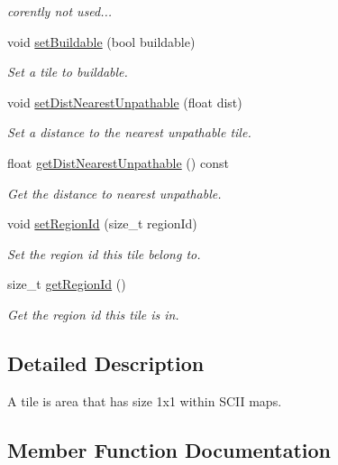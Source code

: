 \begin{DoxyCompactItemize}
\begin{DoxyCompactList}\small\item\em corently not used... \end{DoxyCompactList}\item 
void \hyperlink{classOverseer_1_1Tile_a74ff7d2c91fafc04723059c14d3ec723}{set\+Buildable} (bool buildable)
\begin{DoxyCompactList}\small\item\em Set a tile to buildable. \end{DoxyCompactList}\item 
void \hyperlink{classOverseer_1_1Tile_a5a3b3f84b703b2cd5a9ae56b60e77b4c}{set\+Dist\+Nearest\+Unpathable} (float dist)
\begin{DoxyCompactList}\small\item\em Set a distance to the nearest unpathable tile. \end{DoxyCompactList}\item 
float \hyperlink{classOverseer_1_1Tile_ae2ade272164fce21f27530248add1d18}{get\+Dist\+Nearest\+Unpathable} () const 
\begin{DoxyCompactList}\small\item\em Get the distance to nearest unpathable. \end{DoxyCompactList}\item 
void \hyperlink{classOverseer_1_1Tile_a8f0f9bc7bd55533a4df7cf2cafc08eaa}{set\+Region\+Id} (size\+\_\+t region\+Id)
\begin{DoxyCompactList}\small\item\em Set the region id this tile belong to. \end{DoxyCompactList}\item 
size\+\_\+t \hyperlink{classOverseer_1_1Tile_aa1fa9037029a36f50b3c13130813e825}{get\+Region\+Id} ()
\begin{DoxyCompactList}\small\item\em Get the region id this tile is in. \end{DoxyCompactList}\end{DoxyCompactItemize}


\subsection{Detailed Description}
A tile is area that has size 1x1 within S\+C\+II maps. 

\subsection{Member Function Documentation}
